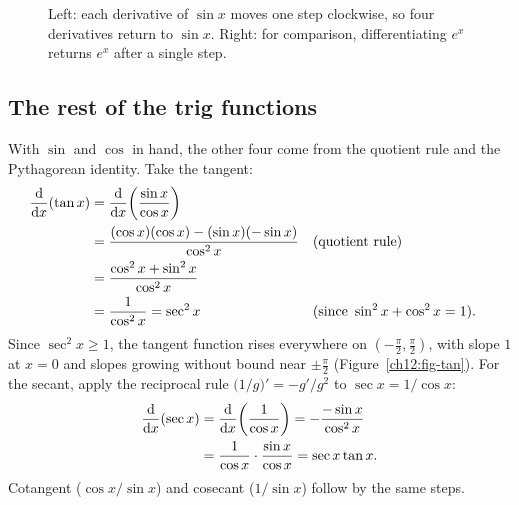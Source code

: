 \begin{figure}[htbp]
\centering
{}
\caption{Left: each derivative of $\sin x$ moves one step clockwise, so four
derivatives return to $\sin x$. Right: for comparison, differentiating $e^x$
returns $e^x$ after a single step.}
\label{ch12:fig-deriv-cycle}
\end{figure}

\subsection{The rest of the trig functions}

With $\sin$ and $\cos$ in hand, the other four come from the quotient rule
and the Pythagorean identity. Take the tangent:
\begin{align*}
   \frac{\mathrm{d}}{\mathrm{d} x}\!\left(\tan x\right)
   &= \frac{\mathrm{d}}{\mathrm{d} x}\!\left(\frac{\sin x}{\cos x}\right) \\
   &= \frac{(\cos x)(\cos x) - (\sin x)(-\sin x)}{\cos^2 x}
   && \text{(quotient rule)} \\
   &= \frac{\cos^2 x + \sin^2 x}{\cos^2 x} \\
   &= \frac{1}{\cos^2 x} = \sec^2 x
   && \text{(since } \sin^2 x+\cos^2 x=1\text{)}.
\end{align*}
Since $\sec^2 x \ge 1$, the tangent function rises everywhere on
$(-\tfrac\pi2,\tfrac\pi2)$, with slope $1$ at $x=0$ and slopes growing without
bound near $\pm\tfrac\pi2$ (Figure~\ref{ch12:fig-tan}).
For the secant, apply the reciprocal rule $\big(1/g\big)' = -g'/g^2$ to $\sec x = 1/\cos x$:
\begin{align*}
   \frac{\mathrm{d}}{\mathrm{d} x}\!\left(\sec x\right)
   &= \frac{\mathrm{d}}{\mathrm{d} x}\!\left(\frac{1}{\cos x}\right)
    = -\frac{-\sin x}{\cos^2 x} \\
   &= \frac{1}{\cos x}\cdot\frac{\sin x}{\cos x}
    = \sec x\tan x.
\end{align*}
Cotangent ($\cos x/\sin x$) and cosecant ($1/\sin x$) follow by the same steps.

